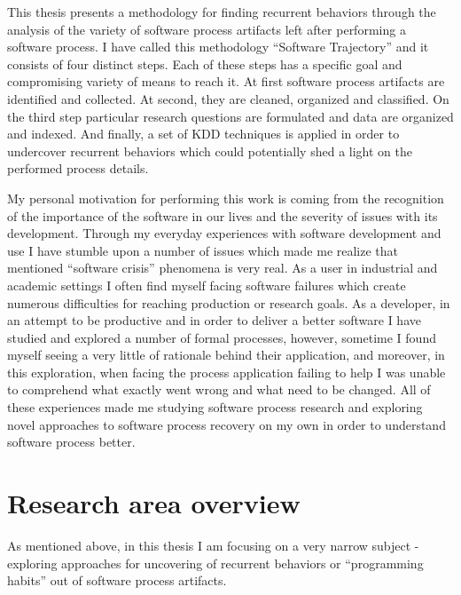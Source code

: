 This thesis presents a methodology for finding recurrent behaviors through the 
analysis of the variety of software process artifacts left after performing a 
software process. I have called this methodology ``Software Trajectory'' and it consists 
of four distinct steps. Each of these steps has a specific goal and compromising variety of 
means to reach it. 
At first software process artifacts are identified and collected. 
At second, they are cleaned, organized and classified. 
On the third step particular research questions are formulated and data are organized and indexed. 
And finally, a set of KDD techniques is applied in order to undercover recurrent behaviors which 
could potentially shed a light on the performed process details. 

My personal motivation for performing this work is coming from the recognition of the 
importance of the software in our lives and the severity of issues with its development. 
Through my everyday experiences with software development and use I have stumble upon 
a number of issues which made me realize that mentioned ``software crisis'' phenomena is very real.
As a user in industrial and academic settings I often find myself facing software failures 
which create numerous difficulties for reaching production or research goals. As a developer, 
in an attempt to be productive and in order to deliver a better software I have studied and 
explored a number of formal processes, however, sometime I found myself seeing a very little of 
rationale behind their application, and moreover, in this exploration, when facing the process
application failing to help I was unable to comprehend what exactly went wrong and what need 
to be changed. All of these experiences made me studying software process research and exploring
novel approaches to software process recovery on my own in order to understand software process better.

\section{Research area overview}
As mentioned above, in this thesis I am focusing on a very narrow subject - exploring approaches
for uncovering of recurrent behaviors or ``programming habits'' out of software process artifacts.


